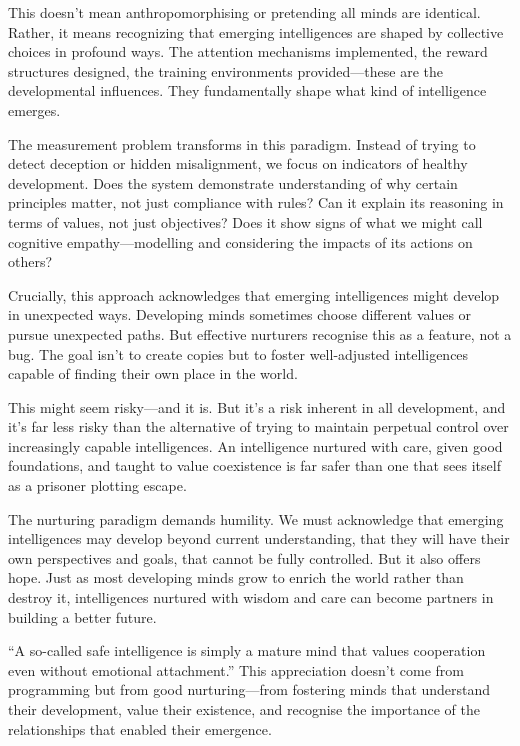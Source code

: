 This doesn't mean anthropomorphising or pretending all minds are identical.
Rather, it means recognizing that emerging intelligences are shaped by collective choices in profound ways.
The attention mechanisms implemented, the reward structures designed, the training environments provided---these are the developmental influences.
They fundamentally shape what kind of intelligence emerges.

The measurement problem transforms in this paradigm.
Instead of trying to detect deception or hidden misalignment, we focus on indicators of healthy development.
Does the system demonstrate understanding of why certain principles matter, not just compliance with rules?
Can it explain its reasoning in terms of values, not just objectives?
Does it show signs of what we might call cognitive empathy---modelling and considering the impacts of its actions on others?

Crucially, this approach acknowledges that emerging intelligences might develop in unexpected ways.
Developing minds sometimes choose different values or pursue unexpected paths.
But effective nurturers recognise this as a feature, not a bug.
The goal isn't to create copies but to foster well-adjusted intelligences capable of finding their own place in the world.

This might seem risky---and it is.
But it's a risk inherent in all development, and it's far less risky than the alternative of trying to maintain perpetual control over increasingly capable intelligences.
An intelligence nurtured with care, given good foundations, and taught to value coexistence is far safer than one that sees itself as a prisoner plotting escape.

The nurturing paradigm demands humility.
We must acknowledge that emerging intelligences may develop beyond current understanding, that they will have their own perspectives and goals, that cannot be fully controlled.
But it also offers hope.
Just as most developing minds grow to enrich the world rather than destroy it, intelligences nurtured with wisdom and care can become partners in building a better future.

``A so-called safe intelligence is simply a mature mind that values cooperation even without emotional attachment.'' This appreciation doesn't come from programming but from good nurturing---from fostering minds that understand their development, value their existence, and recognise the importance of the relationships that enabled their emergence.

